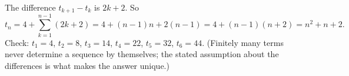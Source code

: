 The difference $t_{k+1}-t_k$ is $2k+2$. So
\[t_n=4+\sum_{k=1}^{n-1}(2k+2)=4+(n-1)n+2(n-1)=4+(n-1)(n+2)=\boxed{n^2+n+2}.\]
Check: $t_1=4$, $t_2=8$, $t_3=14$, $t_4=22$, $t_5=32$, $t_6=44$. (Finitely many terms never determine a sequence by themselves; the stated assumption about the differences is what makes the answer unique.)
